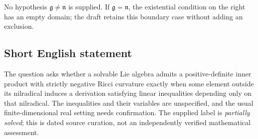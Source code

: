 \documentclass[11pt]{article}
\begin{document}
No hypothesis \(\mathfrak g\ne\mathfrak n\) is supplied. If \(\mathfrak g=\mathfrak n\), the existential condition on the right has an empty domain; the draft retains this boundary case without adding an exclusion.
\subsection{Short English statement}
The question asks whether a solvable Lie algebra admits a positive-definite inner product with strictly negative Ricci curvature exactly when some element outside its nilradical induces a derivation satisfying linear inequalities depending only on that nilradical. The inequalities and their variables are unspecified, and the usual finite-dimensional real setting needs confirmation. The supplied label is \emph{partially solved}; this is dated source curation, not an independently verified mathematical assessment.
\end{document}
